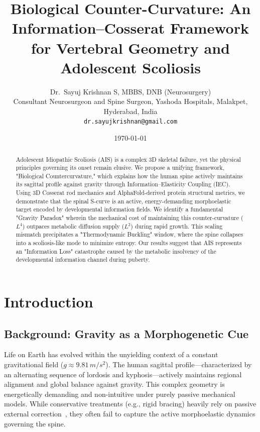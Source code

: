\documentclass[11pt,a4paper]{article}
\title{Biological Counter-Curvature: An Information--Cosserat Framework for Vertebral Geometry and Adolescent Scoliosis}
\author{Dr.~Sayuj Krishnan S, MBBS, DNB (Neurosurgery)\\
Consultant Neurosurgeon and Spine Surgeon, Yashoda Hospitals, Malakpet, Hyderabad, India\\
\texttt{dr.sayujkrishnan@gmail.com}
}
\date{\today}
\begin{document}
\maketitle


\begin{abstract}
Adolescent Idiopathic Scoliosis (AIS) is a complex 3D skeletal failure, yet the physical principles governing its onset remain elusive. We propose a unifying framework, "Biological Countercurvature," which explains how the human spine actively maintains its sagittal profile against gravity through Information--Elasticity Coupling (IEC). Using 3D Cosserat rod mechanics and AlphaFold-derived protein structural metrics, we demonstrate that the spinal S-curve is an active, energy-demanding morphoelastic target encoded by developmental information fields. We identify a fundamental "Gravity Paradox" wherein the mechanical cost of maintaining this counter-curvature ($L^4$) outpaces metabolic diffusion supply ($L^2$) during rapid growth. This scaling mismatch precipitates a "Thermodynamic Buckling" window, where the spine collapses into a scoliosis-like mode to minimize entropy. Our results suggest that AIS represents an "Information Loss" catastrophe caused by the metabolic insolvency of the developmental information channel during puberty.
\end{abstract}


% 

\section{Introduction}

\subsection{Background: Gravity as a Morphogenetic Cue}
Life on Earth has evolved within the unyielding context of a constant gravitational field ($g \approx 9.81 \, m/s^2$). The human sagittal profile---characterized by an alternating sequence of lordosis and kyphosis---actively maintains regional alignment and global balance against gravity. This complex geometry is energetically demanding and non-intuitive under purely passive mechanical models. While conservative treatments (e.g., rigid bracing) heavily rely on passive external correction~\cite{negus_bracing}, they often fail to capture the active morphoelastic dynamics governing the spine.
\end{document}

